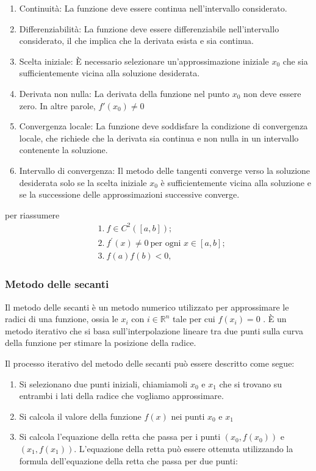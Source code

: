 \documentclass[
]{article}
\begin{document}
\begin{enumerate}
\def\labelenumi{\arabic{enumi}.}
\item
  Continuità: La funzione deve essere continua nell'intervallo
  considerato.
\item
  Differenziabilità: La funzione deve essere differenziabile
  nell'intervallo considerato, il che implica che la derivata esista e
  sia continua.
\item
  Scelta iniziale: È necessario selezionare un'approssimazione iniziale
  \(x_{0}\) che sia sufficientemente vicina alla soluzione desiderata.
\item
  Derivata non nulla: La derivata della funzione nel punto \(x_{0}\) non
  deve essere zero. In altre parole, \(f'(x_{0}) \neq 0\)
\item
  Convergenza locale: La funzione deve soddisfare la condizione di
  convergenza locale, che richiede che la derivata sia continua e non
  nulla in un intervallo contenente la soluzione.
\item
  Intervallo di convergenza: Il metodo delle tangenti converge verso la
  soluzione desiderata solo se la scelta iniziale \(x_{0}\)\hspace{0pt}
  è sufficientemente vicina alla soluzione e se la successione delle
  approssimazioni successive converge.
\end{enumerate}

per riassumere \[
\begin{aligned}
&1.~f\in C^{2}([a,b]); \\
&2.~f ^{\prime}(x)\neq0\ \text{per ogni }x\in[a,b]; \\
&3.~f(a)f(b)<0,
\end{aligned}
\]

\subsubsection{Metodo delle secanti}\label{metodo-delle-secanti}

Il metodo delle secanti è un metodo numerico utilizzato per approssimare
le radici di una funzione, ossia le \(x_{i}\) con
\(i \in \mathbb{R}^{n}\) tale per cui \(f(x_{i}) = 0\) . È un metodo
iterativo che si basa sull'interpolazione lineare tra due punti sulla
curva della funzione per stimare la posizione della radice.

Il processo iterativo del metodo delle secanti può essere descritto come
segue:

\begin{enumerate}
\def\labelenumi{\arabic{enumi}.}
\item
  Si selezionano due punti iniziali, chiamiamoli \(x_0\) e \(x_1\) che
  si trovano su entrambi i lati della radice che vogliamo approssimare.
\item
  Si calcola il valore della funzione \(f(x)\) nei punti \(x_0\) e
  \(x_1\)
\item
  Si calcola l'equazione della retta che passa per i punti
  \((x_0, f(x_0))\) e \((x_1, f(x_1))\). L'equazione della retta può
  essere ottenuta utilizzando la formula dell'equazione della retta che
  passa per due punti:
\end{enumerate}
\end{document}
